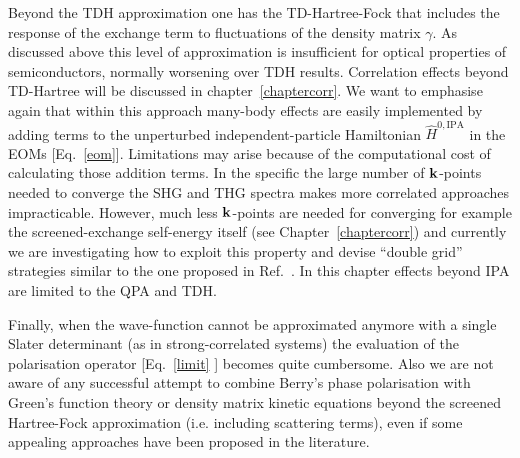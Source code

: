 Beyond the TDH approximation one has the TD-Hartree-Fock that includes the response of the exchange term to fluctuations of the density matrix $\gamma$. As discussed above this level of approximation is insufficient for optical properties of semiconductors, normally worsening over TDH results. 
Correlation effects beyond TD-Hartree will be discussed in chapter~\ref{chaptercorr}.
We want to emphasise again that within this approach many-body effects are easily implemented by adding terms to the unperturbed independent-particle Hamiltonian $\hat H^{0,\text{IPA}}$ in the EOMs [Eq.~\eqref{eom}]. 
Limitations may arise because of the computational cost of calculating those addition terms. In the specific the large number of ${\bf k}$-points needed to converge the SHG and THG spectra makes more correlated approaches impracticable. However, much less ${\bf k}$-points are needed for converging for example the screened-exchange self-energy itself (see Chapter~\ref{chaptercorr}) and currently we are investigating how to exploit this property and devise ``double grid'' strategies similar to the one proposed in Ref.~\cite{kammerlander}. 
In this chapter effects beyond IPA are limited to the QPA and TDH.

Finally, when the wave-function cannot be approximated anymore with a single Slater determinant (as in strong-correlated systems) the evaluation of the polarisation operator [Eq.~\ref{limit} ] becomes quite cumbersome.\cite{stella} Also we are not aware of any successful attempt to combine Berry's phase polarisation with Green's function theory or density matrix kinetic equations beyond the screened Hartree-Fock approximation (i.e. including scattering terms), even if some appealing approaches have been proposed in the literature\cite{restagw,PhysRevB.84.205137,doi:10.7566/JPSJ.83.033708,nourafkan2013electric}.
 
